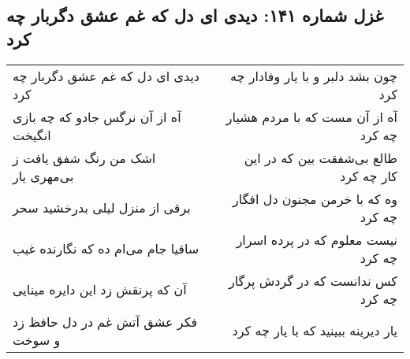 \begin{center}
\section*{غزل شماره ۱۴۱: دیدی ای دل که غم عشق دگربار چه کرد}
\label{sec:sh141}
\begin{longtable}{l p{0.5cm} r}
دیدی ای دل که غم عشق دگربار چه کرد
&&
چون بشد دلبر و با یار وفادار چه کرد
\\
آه از آن نرگس جادو که چه بازی انگیخت
&&
آه از آن مست که با مردم هشیار چه کرد
\\
اشک من رنگ شفق یافت ز بی‌مهری یار
&&
طالع بی‌شفقت بین که در این کار چه کرد
\\
برقی از منزل لیلی بدرخشید سحر
&&
وه که با خرمن مجنون دل افگار چه کرد
\\
ساقیا جام می‌ام ده که نگارنده غیب
&&
نیست معلوم که در پرده اسرار چه کرد
\\
آن که پرنقش زد این دایره مینایی
&&
کس ندانست که در گردش پرگار چه کرد
\\
فکر عشق آتش غم در دل حافظ زد و سوخت
&&
یار دیرینه ببینید که با یار چه کرد
\\
\end{longtable}
\end{center}
